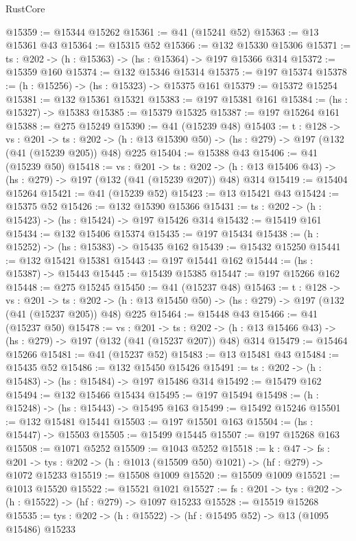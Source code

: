 \begin{lexlean}{RustCore}
\begin{coremodule}
@15359 := @15344 @15262
@15361 := @41 (@15241 @52)
@15363 := @13 @15361 @43
@15364 := @15315 @52
@15366 := @132 @15330 @15306
@15371 := {ts : @202} -> (h : @15363) -> (hs : @15364) -> @197 @15366 @314
@15372 := @15359 @160
@15374 := @132 @15346 @15314
@15375 := @197 @15374
@15378 := (h : @15256) -> (hs : @15323) -> @15375 @161
@15379 := @15372 @15254
@15381 := @132 @15361 @15321
@15383 := @197 @15381 @161
@15384 := (hs : @15327) -> @15383
@15385 := @15379 @15325
@15387 := @197 @15264 @161
@15388 := @275 @15249
@15390 := @41 (@15239 @48)
@15403 := {t : @128} ->
  {vs : @201} ->
  {ts : @202} -> (h : @13 @15390 @50) -> (hs : @279) -> @197 (@132 (@41 (@15239 @205)) @48) @225
@15404 := @15388 @43
@15406 := @41 (@15239 @50)
@15418 := {vs : @201} ->
  {ts : @202} -> (h : @13 @15406 @43) -> (hs : @279) -> @197 (@132 (@41 (@15239 @207)) @48) @314
@15419 := @15404 @15264
@15421 := @41 (@15239 @52)
@15423 := @13 @15421 @43
@15424 := @15375 @52
@15426 := @132 @15390 @15366
@15431 := {ts : @202} -> (h : @15423) -> (hs : @15424) -> @197 @15426 @314
@15432 := @15419 @161
@15434 := @132 @15406 @15374
@15435 := @197 @15434
@15438 := (h : @15252) -> (hs : @15383) -> @15435 @162
@15439 := @15432 @15250
@15441 := @132 @15421 @15381
@15443 := @197 @15441 @162
@15444 := (hs : @15387) -> @15443
@15445 := @15439 @15385
@15447 := @197 @15266 @162
@15448 := @275 @15245
@15450 := @41 (@15237 @48)
@15463 := {t : @128} ->
  {vs : @201} ->
  {ts : @202} -> (h : @13 @15450 @50) -> (hs : @279) -> @197 (@132 (@41 (@15237 @205)) @48) @225
@15464 := @15448 @43
@15466 := @41 (@15237 @50)
@15478 := {vs : @201} ->
  {ts : @202} -> (h : @13 @15466 @43) -> (hs : @279) -> @197 (@132 (@41 (@15237 @207)) @48) @314
@15479 := @15464 @15266
@15481 := @41 (@15237 @52)
@15483 := @13 @15481 @43
@15484 := @15435 @52
@15486 := @132 @15450 @15426
@15491 := {ts : @202} -> (h : @15483) -> (hs : @15484) -> @197 @15486 @314
@15492 := @15479 @162
@15494 := @132 @15466 @15434
@15495 := @197 @15494
@15498 := (h : @15248) -> (hs : @15443) -> @15495 @163
@15499 := @15492 @15246
@15501 := @132 @15481 @15441
@15503 := @197 @15501 @163
@15504 := (hs : @15447) -> @15503
@15505 := @15499 @15445
@15507 := @197 @15268 @163
@15508 := @1071 @5252
@15509 := @1043 @5252
@15518 := {k : @47} ->
  {fs : @201} -> {tys : @202} -> (h : @1013 (@15509 @50) @1021) -> (hf : @279) -> @1072 @15233
@15519 := @15508 @1009
@15520 := @15509 @1009
@15521 := @1013 @15520
@15522 := @15521 @1021
@15527 := {fs : @201} -> {tys : @202} -> (h : @15522) -> (hf : @279) -> @1097 @15233
@15528 := @15519 @15268
@15535 := {tys : @202} -> (h : @15522) -> (hf : @15495 @52) -> @13 (@1095 @15486) @15233

\end{coremodule}
\end{lexlean}
